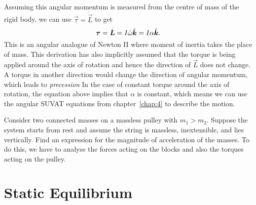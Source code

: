 \documentclass[../classical_mechanics.tex]{subfiles}
\begin{document}
        \paragraph{}
        Assuming this angular momentum is measured from the centre of mass of the rigid body, we can use $\vec{\tau}=\dot{\vec{L}}$ to get
        \begin{equation}
            \boldsymbol{\tau}=\dot{\boldsymbol{L}}=I\dot{\omega}\hat{\boldsymbol{k}}=I\alpha\hat{\boldsymbol{k}}.
        \end{equation}
        This is an angular analogue of Newton II where moment of inertia takes the place of mass.
        This derivation has also implicitly assumed that the torque is being applied around the axis of rotation and hence the direction of $\vec{L}$ does not change.
        A torque in another direction would change the direction of angular momentum, which leads to \textit{precession}
        In the case of constant torque around the axis of rotation, the equation above implies that $\alpha$ is constant, which means we can use the angular SUVAT equations from chapter~\ref{chap:4} to describe the motion. 
        \begin{example}
            Consider two connected masses on a massless pulley with $m_1>m_2$.
            Suppose the system starts from rest and assume the string is massless, inextensible, and lies vertically.
            Find an expression for the magnitude of acceleration of the masses.
            To do this, we have to analyse the forces acting on the blocks and also the torques acting on the pulley.
        \end{example}


    \section{Static Equilibrium}
\end{document}
